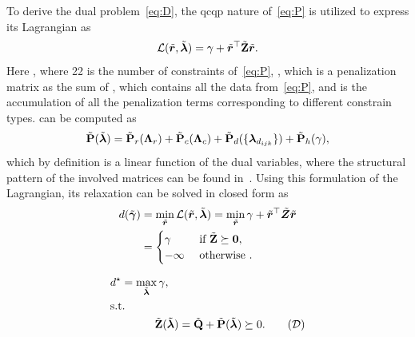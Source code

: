 To derive the dual problem~\ref{eq:D}, the \gls{qcqp} nature of~\ref{eq:P} is utilized to express its Lagrangian as
\begin{equation}
	\mathcal{L}(\tilde{\bm{r}}, \tilde{\bm{\lambda}}) = \gamma + \tilde{\bm{r}}^\top  \tilde{\bm{\mathrm{Z}}}  \tilde{\bm{r}}.
\end{equation}
Here , where \num{22} is the number of constraints of~\ref{eq:P}, , which is a penalization matrix as the sum of , which contains all the data from~\ref{eq:P}, and  is the accumulation of all the penalization terms corresponding to different constrain types.  can be computed as
%
\begin{equation}
	\tilde{\bm{\mathrm{P}}}(\tilde{\bm{\lambda}}) = \tilde{\bm{\mathrm{P}}}_r(\bm{\mathrm{\Lambda}}_r) + \tilde{\bm{\mathrm{P}}}_c(\bm{\mathrm{\Lambda}}_c) + \tilde{\bm{\mathrm{P}}}_d(\{ \bm{\lambda}_{d_{ijk}} \}) + \tilde{\bm{\mathrm{P}}}_h(\gamma),
\end{equation}
which by definition is a linear function of the dual variables, where the structural pattern of the involved matrices can be found in~\cite{convex-global-3d-registration-with-lagrangian-duality}. Using this formulation of the Lagrangian, its relaxation can be solved in closed form as 
\begin{align}
	d(\tilde{\bm{\gamma}})&=\min_{\tilde{\bm{r}}}\mathcal{L}(\tilde{\bm{r}},\tilde{\bm{\lambda}})=\min_{\tilde{\bm{r}}} \gamma + \tilde{\bm{r}}^\top \tilde{\bm{Z}} \tilde{\bm{r}} \\
	&= \begin{cases}
		\gamma & \text{ if } \tilde{\bm{\mathrm{Z}}} \succeq \bm{0}, \\
		-\infty & \text{ otherwise }.
	\end{cases}
\end{align}


\begin{align*}
	& d^\star = \max_{\tilde{\vec{\lambda}}} \gamma, \\
	& \text{s.t. }         \\ 
	&\qquad \qquad \tilde{\mat{Z}}(\tilde{\vec{\lambda}})=\tilde{\mat{Q}} + \tilde{\mat{P}}(\tilde{\vec{\lambda}}) \succeq 0. \tag{$\mathcal{D}$} \label{eq:D}\\
\end{align*}




